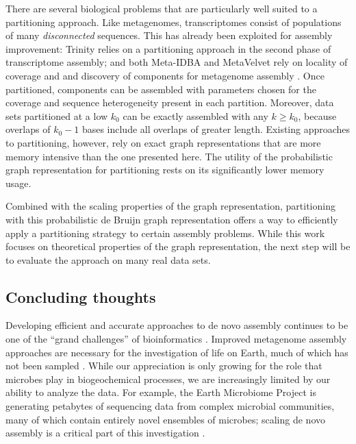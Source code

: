 \documentclass{pnastwo}
\begin{document}
\begin{article}

There are several biological problems that are particularly well
suited to a partitioning approach.  Like metagenomes, transcriptomes
consist of populations of many {\em disconnected} sequences.  This has
already been exploited for assembly improvement: Trinity relies on a
partitioning approach in the second phase of transcriptome assembly;
and both Meta-IDBA and MetaVelvet rely on locality of coverage and and
discovery of components for metagenome assembly
\cite{metavelvet,pubmed21685107,trinity}.  Once partitioned, components
can be assembled with parameters chosen for the coverage and sequence
heterogeneity present in each partition.  Moreover, data sets partitioned
at a low $k_0$ can be exactly assembled with any $k \ge k_0$, because
overlaps of $k_0-1$ bases include all overlaps of greater length.
Existing approaches to partitioning, however,
rely on exact graph representations that are more memory intensive
than the one presented here.  The utility of the probabilistic graph
representation for partitioning rests on its significantly lower
memory usage.

Combined with the scaling
properties of the graph representation, partitioning with this probabilistic
de Bruijn graph representation offers a way to
efficiently apply a partitioning strategy to certain
assembly problems.  While this work focuses on theoretical properties
of the graph representation, the next step will be to evaluate the approach
on many real data sets.

\subsection{Concluding thoughts}


Developing efficient and accurate approaches to de novo assembly
continues to be one of the ``grand challenges'' of bioinformatics
\cite{pubmed22147368}.  Improved metagenome assembly approaches are
necessary for the investigation of life on Earth, much
of which has not been sampled \cite{terabasemetag}.  While our appreciation is
only growing for the role that microbes play in biogeochemical processes,
we are increasingly limited by our ability to analyze the data.  For
example, the Earth Microbiome Project is generating petabytes of
sequencing data from complex microbial communities, many of which
contain entirely novel ensembles of microbes; scaling de novo assembly
is a critical part of this investigation \cite{emp2010}.


\end{article}
\end{document}
